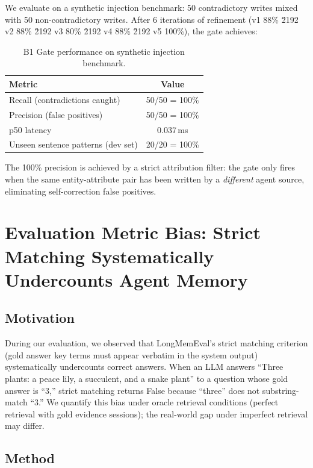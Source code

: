 \documentclass{article}
\begin{document}
We evaluate on a synthetic injection benchmark: 50 contradictory writes mixed with 50 non-contradictory writes. After 6 iterations of refinement (v1 88\% \u2192 v2 88\% \u2192 v3 80\% \u2192 v4 88\% \u2192 v5 100\%), the gate achieves:

\begin{table}[h]
\centering
\caption{B1 Gate performance on synthetic injection benchmark.}
\begin{tabular}{lc}
\toprule
Metric & Value \\
\midrule
Recall (contradictions caught) & 50/50 = 100\% \\
Precision (false positives) & 50/50 = 100\% \\
p50 latency & 0.037\,ms \\
Unseen sentence patterns (dev set) & 20/20 = 100\% \\
\bottomrule
\end{tabular}
\end{table}

The 100\% precision is achieved by a strict attribution filter: the gate only fires when the same entity-attribute pair has been written by a \emph{different} agent source, eliminating self-correction false positives.

\section{Evaluation Metric Bias: Strict Matching Systematically Undercounts Agent Memory}
\label{sec:metric_bias}

\subsection{Motivation}

During our evaluation, we observed that LongMemEval's strict matching criterion (gold answer key terms must appear verbatim in the system output) systematically undercounts correct answers. When an LLM answers ``Three plants: a peace lily, a succulent, and a snake plant'' to a question whose gold answer is ``3,'' strict matching returns False because ``three'' does not substring-match ``3.'' We quantify this bias under oracle retrieval conditions (perfect retrieval with gold evidence sessions); the real-world gap under imperfect retrieval may differ.

\subsection{Method}
\end{document}

